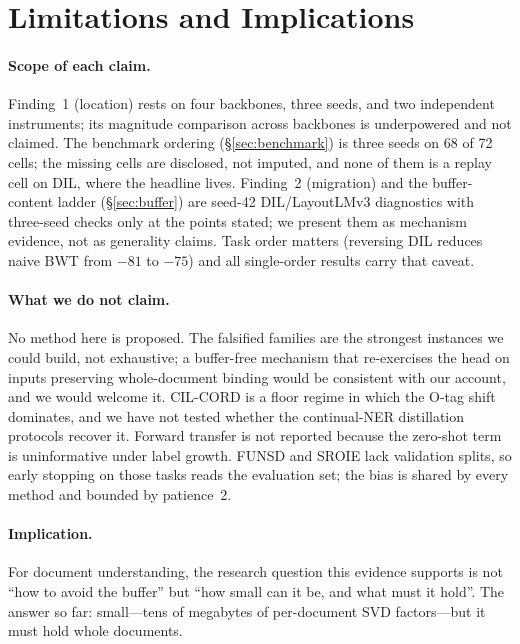 \documentclass{article}
\begin{document}
\section{Limitations and Implications}
\label{sec:limitations}
\paragraph{Scope of each claim.} Finding~1 (location) rests on four backbones, three seeds, and two independent instruments; its magnitude comparison across backbones is underpowered and not claimed. The benchmark ordering (\S\ref{sec:benchmark}) is three seeds on 68 of 72 cells; the missing cells are disclosed, not imputed, and none of them is a replay cell on DIL, where the headline lives. Finding~2 (migration) and the buffer-content ladder (\S\ref{sec:buffer}) are seed-42 DIL/LayoutLMv3 diagnostics with three-seed checks only at the points stated; we present them as mechanism evidence, not as generality claims. Task order matters (reversing DIL reduces naive BWT from $-81$ to $-75$) and all single-order results carry that caveat.

\paragraph{What we do not claim.} No method here is proposed. The falsified families are the strongest instances we could build, not exhaustive; a buffer-free mechanism that re-exercises the head on inputs preserving whole-document binding would be consistent with our account, and we would welcome it. CIL-CORD is a floor regime in which the O-tag shift dominates, and we have not tested whether the continual-NER distillation protocols recover it. Forward transfer is not reported because the zero-shot term is uninformative under label growth. FUNSD and SROIE lack validation splits, so early stopping on those tasks reads the evaluation set; the bias is shared by every method and bounded by patience~2.

\paragraph{Implication.} For document understanding, the research question this evidence supports is not ``how to avoid the buffer'' but ``how small can it be, and what must it hold''. The answer so far: small---tens of megabytes of per-document SVD factors---but it must hold whole documents.



\end{document}
